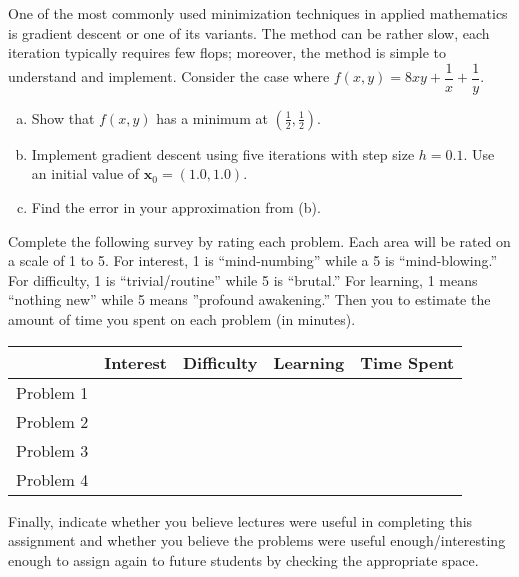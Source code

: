 \documentclass[11pt,letterpaper]{article}
\begin{document}
\newpage



 One of the most commonly used minimization techniques in applied mathematics is gradient descent or one of its variants. The method can be rather slow, each iteration typically requires few flops; moreover, the method is simple to understand and implement. Consider the case where $f(x, y)= 8xy + \dfrac{1}{x} + \dfrac{1}{y}$. 
	\begin{enumerate}[(a)]
	\item Show that $f(x, y)$ has a minimum at $(\frac{1}{2}, \frac{1}{2})$. 
	\item Implement gradient descent using five iterations with step size $h= 0.1$. Use an initial value of $\mathbf{x}_0= (1.0, 1.0)$. 
	\item Find the error in your approximation from (b). 
	\end{enumerate}



\newpage



 \pvspace{0.3cm}

Complete the following survey by rating each problem. Each area will be rated on a scale of 1 to 5. For interest, 1 is ``mind-numbing'' while a 5 is ``mind-blowing.'' For difficulty, 1 is ``trivial/routine'' while 5 is ``brutal.'' For learning, 1 means ``nothing new'' while 5 means ''profound awakening.'' Then you to estimate the amount of time you spent on each problem (in minutes). 

\vspace{0.25cm}
\begin{center}
\begin{tabular}{c||c|c|c|c|}
 & Interest & Difficulty & Learning & Time Spent \\ \hline \hline
Problem 1 &  &  &  &  \\ \hline
Problem 2 &  &  &  &  \\ \hline
Problem 3 &  &  &  &  \\ \hline
Problem 4 &  &  &  & 
\end{tabular}
\end{center}
\vspace{0.25cm}

Finally, indicate whether you believe lectures were useful in completing this assignment and whether you believe the problems were useful enough/interesting enough to assign again to future students by checking the appropriate space.
\end{document}
